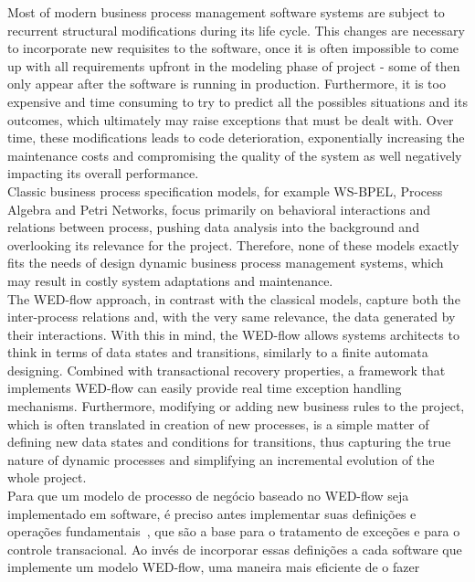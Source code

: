 \documentclass[conference]{IEEEtran}
\begin{document}
Most of modern business process management software systems are subject to recurrent structural modifications during its
life cycle. This changes are necessary to incorporate new requisites to the software, once it is often impossible 
to come up with all requirements upfront in the modeling phase of project - some of then only appear after the software
is running in production. Furthermore, it is too expensive and time consuming to try to predict all the possibles situations 
and its outcomes, which ultimately may raise exceptions that must be dealt with. Over time, these modifications leads
to code deterioration, exponentially increasing the maintenance costs and compromising the quality of the system as well 
negatively impacting its overall performance.
\\
\indent  Classic business process specification models, for example WS-BPEL, Process Algebra and Petri Networks, focus primarily
on behavioral interactions and relations between process, pushing data analysis into the background and overlooking its
relevance for the project. Therefore, none of these models exactly fits the needs of design dynamic business process 
management systems, which may result in costly system adaptations and maintenance.
\\
\indent  The WED-flow approach, in contrast with the classical models, capture both the inter-process relations and, with the very
same relevance, the data generated by their interactions. With this in mind, the WED-flow allows systems architects to 
think in terms of data states and transitions, similarly to a finite automata designing. Combined with transactional
recovery properties, a framework that implements WED-flow can easily provide real time exception handling mechanisms.
Furthermore, modifying or adding new business rules to the project, which is often translated in creation of new processes, is a simple
matter of defining new data states and conditions for transitions, thus capturing the true nature of dynamic processes
and simplifying an incremental evolution of the whole project.
\\
\indent Para que um modelo de processo de negócio baseado no WED-flow seja implementado em software, é preciso antes
implementar suas definições e operações fundamentais~\cite{ICWS12}, que são a base para o tratamento de exceções e para o controle transacional.  
Ao invés de incorporar essas definições a cada software que implemente um modelo WED-flow, uma maneira mais eficiente de o fazer
\end{document}
